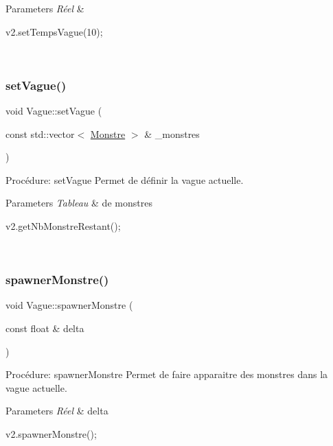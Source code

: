 \begin{DoxyParams}{Parameters}
{\em Réel} & 
\begin{DoxyCode}
v2.setTempsVague(10);
\end{DoxyCode}
 \\
\hline
\end{DoxyParams}
\mbox{\label{classVague_af6bc246e66011691775c3ceb9356ffc8}} 
\subsubsection{\texorpdfstring{set\+Vague()}{setVague()}}
{\footnotesize\ttfamily void Vague\+::set\+Vague (\begin{DoxyParamCaption}\item[{const std\+::vector$<$ \hyperlink{classMonstre}{Monstre} $>$ \&}]{\+\_\+monstres }\end{DoxyParamCaption})}



Procédure\+: set\+Vague Permet de définir la vague actuelle. 


\begin{DoxyParams}{Parameters}
{\em Tableau} & de monstres 
\begin{DoxyCode}
v2.getNbMonstreRestant();
\end{DoxyCode}
 \\
\hline
\end{DoxyParams}
\mbox{\label{classVague_a2479faa494f68587eebb3c9e74407761}} 
\subsubsection{\texorpdfstring{spawner\+Monstre()}{spawnerMonstre()}}
{\footnotesize\ttfamily void Vague\+::spawner\+Monstre (\begin{DoxyParamCaption}\item[{const float \&}]{delta }\end{DoxyParamCaption})}



Procédure\+: spawner\+Monstre Permet de faire apparaitre des monstres dans la vague actuelle. 


\begin{DoxyParams}{Parameters}
{\em Réel} & delta 
\begin{DoxyCode}
v2.spawnerMonstre();
\end{DoxyCode}
 \\
\hline
\end{DoxyParams}
\mbox{\label{classVague_a00fd363241fbfd6ed6819d408155a6ee}} 
